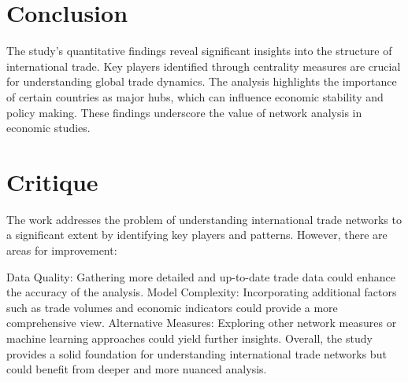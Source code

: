 \documentclass[12pt, a4paper]{article}
\begin{document}
\section{Conclusion}
\label{conclusion}

The study's quantitative findings reveal significant insights into the structure of international trade. Key players identified through centrality measures are crucial for understanding global trade dynamics. The analysis highlights the importance of certain countries as major hubs, which can influence economic stability and policy making. These findings underscore the value of network analysis in economic studies.

\section{Critique}
\label{critique}

The work addresses the problem of understanding international trade networks to a significant extent by identifying key players and patterns. However, there are areas for improvement:

Data Quality: Gathering more detailed and up-to-date trade data could enhance the accuracy of the analysis.
Model Complexity: Incorporating additional factors such as trade volumes and economic indicators could provide a more comprehensive view.
Alternative Measures: Exploring other network measures or machine learning approaches could yield further insights.
Overall, the study provides a solid foundation for understanding international trade networks but could benefit from deeper and more nuanced analysis.
\end{document}
